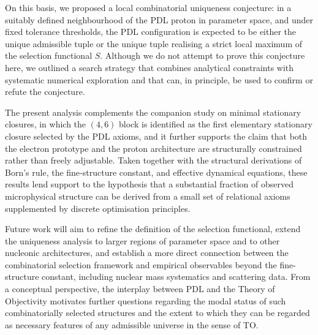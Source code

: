 \documentclass[11pt,a4paper]{article}
\theoremstyle{definition}
\begin{document}
On this basis, we proposed a local combinatorial uniqueness conjecture: in a suitably defined neighbourhood of the PDL proton in parameter space, and under fixed tolerance thresholds, the PDL configuration is expected to be either the unique admissible tuple or the unique tuple realising a strict local maximum of the selection functional $S$.\cite{Combinatorial_Proton_v2_2026,PDL_Global_Mapping_2026} Although we do not attempt to prove this conjecture here, we outlined a search strategy that combines analytical constraints with systematic numerical exploration and that can, in principle, be used to confirm or refute the conjecture.

The present analysis complements the companion study on minimal stationary closures, in which the $(4,6)$ block is identified as the first elementary stationary closure selected by the PDL axioms, and it further supports the claim that both the electron prototype and the proton architecture are structurally constrained rather than freely adjustable.\cite{PDL_Main_2026,PDL_Intro_2026} Taken together with the structural derivations of Born’s rule, the fine-structure constant, and effective dynamical equations, these results lend support to the hypothesis that a substantial fraction of observed microphysical structure can be derived from a small set of relational axioms supplemented by discrete optimisation principles.\cite{Born_Golden_v2_2026,Gleason_PDL_2026,Alpha_PDL_v2_2026,Schrodinger_PDL_v2_2026,Einstein_Dirac_PDL_2026}

Future work will aim to refine the definition of the selection functional, extend the uniqueness analysis to larger regions of parameter space and to other nucleonic architectures, and establish a more direct connection between the combinatorial selection framework and empirical observables beyond the fine-structure constant, including nuclear mass systematics and scattering data.\cite{Effective_Fields_PDL_2026,PDL_Global_Mapping_2026} From a conceptual perspective, the interplay between PDL and the Theory of Objectivity motivates further questions regarding the modal status of such combinatorially selected structures and the extent to which they can be regarded as necessary features of any admissible universe in the sense of TO.\cite{PDL_TO_Dialogue_2026}


\nocite{*}

\end{document}
